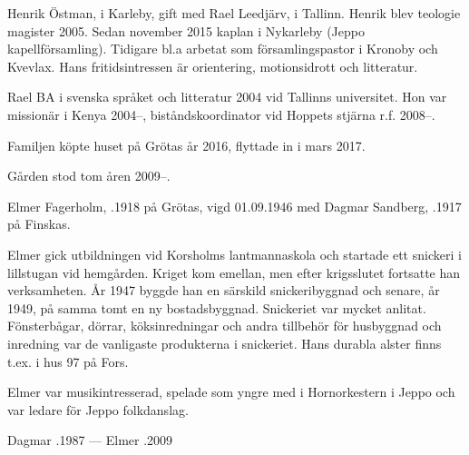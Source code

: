 
Henrik Östman,  i Karleby, gift med Rael Leedjärv,   i Tallinn. Henrik blev teologie magister 2005. Sedan november 2015 kaplan i Nykarleby (Jeppo kapellförsamling). Tidigare bl.a arbetat som församlingspastor i Kronoby och Kvevlax. Hans fritidsintressen är orientering, motionsidrott och litteratur.

Rael BA i svenska språket och litteratur 2004 vid Tallinns universitet. Hon var missionär i Kenya 2004--, biståndskoordinator vid Hoppets stjärna r.f. 2008--.
\begin{jhchildren}
  \item {}
  \item {}
\end{jhchildren}
Familjen köpte huset på Grötas år 2016, flyttade in i mars 2017.


Gården stod tom åren 2009--.\jhvspace{}


Elmer Fagerholm, .1918 på Grötas, vigd 01.09.1946 med Dagmar Sandberg, .1917 på Finskas.
\begin{jhchildren}
  \item {}
  \item {}
\end{jhchildren}

Elmer gick utbildningen vid Korsholms lantmannaskola och startade ett snickeri i lillstugan vid hemgården. Kriget kom emellan, men efter krigsslutet fortsatte han verksamheten. År 1947 byggde han en särskild snickeribyggnad och senare, år 1949, på samma tomt en ny bostadsbyggnad. Snickeriet var mycket anlitat. Fönsterbågar, dörrar, köksinredningar och andra tillbehör för husbyggnad och inredning var de vanligaste produkterna i snickeriet. Hans durabla alster finns t.ex. i hus 97 på Fors.

Elmer var musikintresserad, spelade som yngre med i Hornorkestern i Jeppo och var ledare för Jeppo folkdanslag.

Dagmar .1987  ---  Elmer .2009



